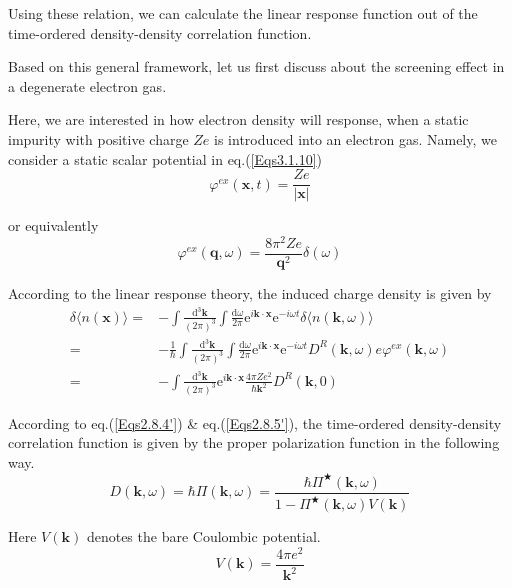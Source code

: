 Using these relation, we can calculate the linear response function out of the time-ordered density-density correlation function.

Based on this general framework, let us first discuss about the screening effect in a degenerate electron gas.

Here, we are interested in how electron density will response, when a static impurity with positive charge $Z e$ is introduced into an electron gas. Namely, we consider a static scalar potential in eq.(\ref{Eqs3.1.10})
\begin{equation} \label{Eqs3.1.19}
\varphi^{ex}(\mathbf{x},t) = \frac{Z e}{|\mathbf{x}|}
\end{equation}

or equivalently
\begin{equation*} \label{Eqs3.1.19'} \tag{3.1.19'}
\varphi^{ex}(\mathbf{q},\omega) = \frac{8\pi^2 Z e}{\mathbf{q}^2} \delta(\omega)
\end{equation*}

According to the linear response theory, the induced charge density is given by
\begin{equation} \label{Eqs3.1.20}\begin{split} \delta\langle n(\mathbf{x}) \rangle =& -\int \frac{\mathrm{d}^3 \mathbf{k}}{(2\pi)^3} \int \frac{\mathrm{d} \omega}{2\pi} \mathrm{e}^{i \mathbf{k} \cdot \mathbf{x}}\mathrm{e}^{-i \omega t} \delta\langle n(\mathbf{k},\omega) \rangle\\
=& -\frac{1}{\hbar} \int \frac{\mathrm{d}^3 \mathbf{k}}{(2\pi)^3}\int \frac{\mathrm{d}\omega}{2\pi} \mathrm{e}^{i \mathbf{k} \cdot \mathbf{x}}\mathrm{e}^{-i \omega t} D^R(\mathbf{k},\omega) e \varphi^{ex}(\mathbf{k},\omega)\\
=& - \int \frac{\mathrm{d}^3 \mathbf{k}}{(2\pi)^3} \mathrm{e}^{i \mathbf{k}\cdot \mathbf{x}}\frac{4\pi Z e^2}{\hbar \mathbf{k}^2} D^R(\mathbf{k},0) \end{split}\end{equation}

According to eq.(\ref{Eqs2.8.4'}) \& eq.(\ref{Eqs2.8.5'}), the time-ordered density-density correlation function is given by the proper polarization function in the following way.
\[ D(\mathbf{k},\omega) = \hbar \Pi(\mathbf{k},\omega) = \frac{\hbar \Pi^{\bigstar}(\mathbf{k},\omega)}{1-\Pi^{\bigstar}(\mathbf{k},\omega)V(\mathbf{k})} \]

Here $V(\mathbf{k})$ denotes the bare Coulombic potential.
\[ V(\mathbf{k}) = \frac{4\pi e^2}{\mathbf{k}^2} \]

